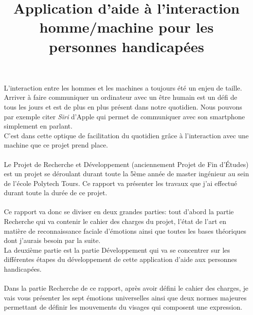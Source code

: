 \documentclass[poster]{polytech/polytech}
\title{Application d'aide à l'interaction homme/machine pour les personnes handicapées}
\begin{document}
\maketitle


L'interaction entre les hommes et les machines a toujours été un enjeu de taille. Arriver à faire communiquer un ordinateur avec un être humain est un défi de tous les jours et est de plus en plus présent dans notre quotidien. Nous pouvons par exemple citer \textit{Siri} d'Apple qui permet de communiquer avec son smartphone simplement en parlant.\\ 
C'est dans cette optique de facilitation du quotidien grâce à l'interaction avec une machine que ce projet prend place.\\
\\
Le Projet de Recherche et Développement (anciennement Projet de Fin d'Études) est un projet se déroulant durant toute la 5ème année de master ingénieur au sein de l'école Polytech Tours. Ce rapport va présenter les travaux que j'ai effectué durant toute la durée de ce projet.\\
\\
Ce rapport va donc se diviser en deux grandes parties: tout d'abord la partie Recherche qui va contenir le cahier des charges du projet, l'état de l'art en matière de reconnaissance faciale d'émotions ainsi que toutes les bases théoriques dont j'aurais besoin par la suite.\\
La deuxième partie est la partie Développement qui va se concentrer sur les différentes étapes du développement de cette application d'aide aux personnes handicapées.\\
\\
Dans la partie Recherche de ce rapport, après avoir défini le cahier des charges, je vais vous présenter les sept émotions universelles ainsi que deux normes majeures permettant de définir les mouvements du visages qui composent une expression.\\
\end{document}
